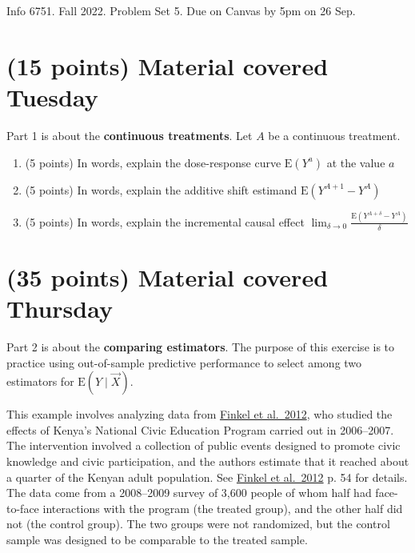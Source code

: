 \documentclass[10pt]{article}
\newcommand{\E}{\textrm{E}}
\begin{document}
\begin{Large} 
Info 6751. Fall 2022. Problem Set 5. Due on Canvas by 5pm on 26 Sep.
\end{Large}
\hline

\section{(15 points) Material covered Tuesday}
Part 1 is about the \textbf{continuous treatments}. Let $A$ be a continuous treatment.

\begin{enumerate}
    \item (5 points) In words, explain the dose-response curve $\E(Y^a)$ at the value $a$
    \item (5 points) In words, explain the additive shift estimand $\E(Y^{A+1} - Y^A)$
    \item (5 points) In words, explain the incremental causal effect $\lim_{\delta\rightarrow 0}\frac{\E(Y^{A + \delta} - Y^A)}{\delta}$ 
\end{enumerate}

\section{(35 points) Material covered Thursday}
Part 2 is about the \textbf{comparing estimators}. The purpose of this exercise is to practice using out-of-sample predictive performance to select among two estimators for $\E(Y\mid\vec{X})$.

This example involves analyzing data from \href{https://doi.org/10.1017/S0022381611001162}{Finkel et al.~2012}, who studied the effects of Kenya's National Civic Education
Program carried out in 2006--2007. The intervention involved a collection of public events designed to promote civic knowledge and civic participation, and the authors estimate that it reached about a quarter of the Kenyan adult population. See \href{https://doi.org/10.1017/S0022381611001162}{Finkel et al.~2012} p. 54 for details. The data come from a 2008--2009 survey of 3,600 people of whom half had face-to-face interactions with the program (the treated group), and the other half did not (the control group). The two groups were not randomized, but the control sample was designed to be comparable to the treated sample.
\end{document}

